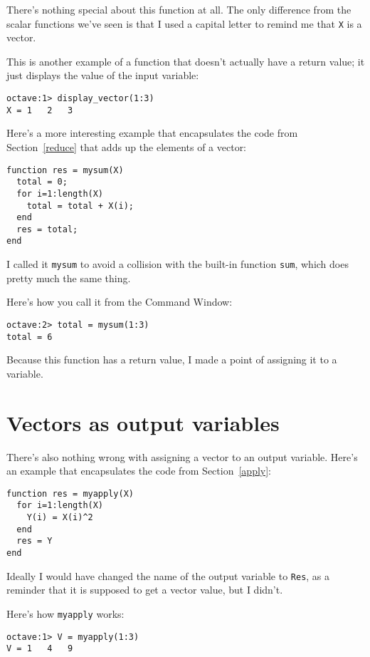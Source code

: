 There's nothing special about this function at all. The only
difference from the scalar functions we've seen is that I used
a capital letter to remind me that {\tt X} is a vector.

This is another example of a function that doesn't actually have
a return value; it just displays the value of the input variable:

\begin{verbatim}
octave:1> display_vector(1:3)
X = 1   2   3
\end{verbatim}

Here's a more interesting example that encapsulates the code
from Section~\ref{reduce} that adds up the elements of a vector:

\begin{verbatim}
function res = mysum(X)
  total = 0;
  for i=1:length(X)
    total = total + X(i);
  end
  res = total;
end
\end{verbatim}

I called it {\tt mysum} to avoid a collision with the built-in
function {\tt sum}, which does pretty much the same thing.

Here's how you call it from the Command Window:

\begin{verbatim}
octave:2> total = mysum(1:3)
total = 6
\end{verbatim}

Because this function has a return value, I made a
point of assigning it to a variable.


\section{Vectors as output variables}

There's also nothing wrong with assigning a vector to an output
variable. Here's an example that encapsulates the code from
Section~\ref{apply}:

\begin{verbatim}
function res = myapply(X)
  for i=1:length(X)
    Y(i) = X(i)^2
  end
  res = Y
end
\end{verbatim}

Ideally I would have changed the name of the output variable to
{\tt Res}, as a reminder that it is supposed to get a vector value,
but I didn't.

Here's how {\tt myapply} works:

\begin{verbatim}
octave:1> V = myapply(1:3)
V = 1   4   9
\end{verbatim}

